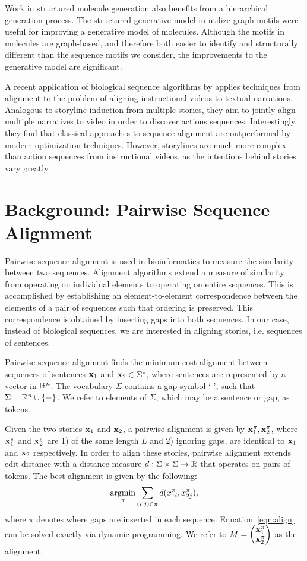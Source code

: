 \documentclass{article}
\begin{document}
Work in structured molecule generation also benefits from a 
hierarchical generation process.
The structured generative model in \citet{wengong2020moleculemotif}
utilize graph motifs were useful for improving a generative model of molecules.
Although the motifs in molecules are graph-based, and therefore both
easier to identify and structurally different than the sequence motifs we consider,
the improvements to the generative model are significant.

A recent application of biological sequence algorithms
by \citet{alayrac2015align} applies techniques from alignment
to the problem of aligning instructional videos to textual narrations.
Analogous to storyline induction from multiple stories,
they aim to jointly align multiple narratives to video
in order to discover actions sequences.
Interestingly, they find that classical approaches
to sequence alignment are outperformed by modern optimization techniques.
However, storylines are much more complex than action sequences from instructional videos,
as the intentions behind stories vary greatly.

\section{Background: Pairwise Sequence Alignment}
Pairwise sequence alignment is used in bioinformatics to measure the similarity between
two sequences.
Alignment algorithms extend a measure of similarity from operating on individual elements
to operating on entire sequences.
This is accomplished by establishing an element-to-element correspondence between 
the elements of a pair of sequences such that ordering is preserved.
This correspondence is obtained by inserting gaps into both sequences.
In our case, instead of biological sequences, we are interested in aligning stories,
i.e. sequences of sentences.

Pairwise sequence alignment finds the minimum cost alignment
between sequences of sentences $\mathbf{x}_1$ and $\mathbf{x}_2\in\Sigma^*$,
where sentences are represented by a vector in $\mathbb{R}^n$.
The vocabulary $\Sigma$ contains a gap symbol `-', such that $\Sigma = \mathbb{R}^n \cup \left\{-\right\}$.
We refer to elements of $\Sigma$, which may be a sentence or gap, as tokens.

Given the two stories $\mathbf{x}_1$ and $\mathbf{x}_2$, a pairwise alignment is given by $\mathbf{x}_1^\pi, \mathbf{x}_2^\pi$,
where $\mathbf{x}_1^\pi$ and $\mathbf{x}_2^\pi$ are 1) of the same length $L$ and 2) ignoring gaps,
are identical to $\mathbf{x}_1$ and $\mathbf{x}_2$ respectively.
In order to align these stories, pairwise alignment extends edit distance
with a distance measure $d: \Sigma\times\Sigma\to\mathbb{R}$ that operates on pairs of tokens.
The best alignment is given by the following:
\begin{equation}
\label{eqn:align}
\operatorname*{argmin}_\pi \sum_{(i, j) \in \pi} d(x_{1i}^\pi,x_{2j}^\pi),
\end{equation}
where $\pi$ denotes where gaps are inserted in each sequence.
Equation~\ref{eqn:align} can be solved exactly via dynamic programming.
We refer to 
$M = \begin{pmatrix}\mathbf{x}^\pi_1 \\ \mathbf{x}^\pi_2 \end{pmatrix}$
as the alignment.
\end{document}
